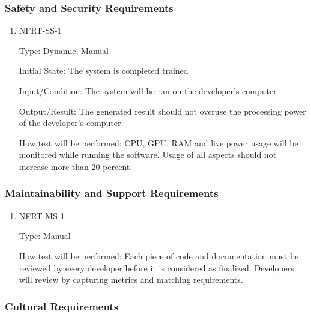 \documentclass[12pt, titlepage]{article}
\begin{document}
\subsubsection{Safety and Security Requirements}


\begin{enumerate}

\item{NFRT-SS-1\\}

Type: Dynamic, Manual
					
Initial State: The system is completed trained 
					
Input/Condition: The system will be ran on the developer's computer
					
Output/Result: The generated result should not overuse the processing power of the developer's computer
					
How test will be performed: CPU, GPU, RAM and live power usage will be monitored while running the software. Usage of all aspects should not increase more than 20 percent.   
					
\end{enumerate}

\subsubsection{Maintainability and Support Requirements}
		

\begin{enumerate}

\item{NFRT-MS-1\\}

Type: Manual
					
How test will be performed: Each piece of code and documentation must be reviewed by every developer before it is considered as finalized. Developers will review by capturing metrics and matching requirements. 

\end{enumerate}

\subsubsection{Cultural Requirements}
\end{document}

